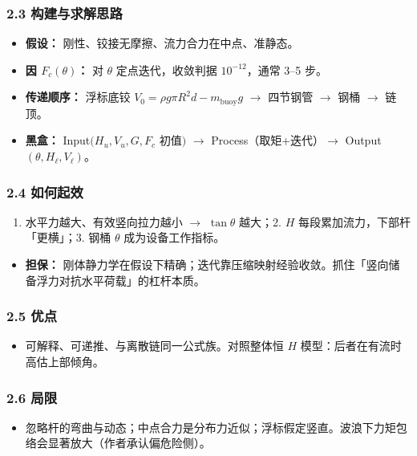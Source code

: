\documentclass[UTF8,a4paper,zihao=-4]{ctexart}
\begin{document}
\subsubsection{\texorpdfstring{2.3 构建与求解思路}{2.3 构建与求解思路}}
\begin{itemize}[leftmargin=1.5em]
\item \textbf{假设：} 刚性、铰接无摩擦、流力合力在中点、准静态。
\item \textbf{因 \(F_c(\theta)\)：} 对 \(\theta\) 定点迭代，收敛判据 \(10^{-12}\)，通常 3--5 步。
\item \textbf{传递顺序：} 浮标底铰 \(V_0=\rho g\pi R^2 d-m_{\mathrm{buoy}}g\) $\rightarrow$ 四节钢管 $\rightarrow$ 钢桶 $\rightarrow$ 链顶。
\item \textbf{黑盒：} Input\((H_u,V_u,G,F_c\) 初值\()\) $\rightarrow$ Process（取矩+迭代）$\rightarrow$ Output\((\theta,H_\ell,V_\ell)\)。
\end{itemize}

\subsubsection{\texorpdfstring{2.4 如何起效}{2.4 如何起效}}
\begin{enumerate}[leftmargin=1.8em]
\item 水平力越大、有效竖向拉力越小 $\rightarrow$ \(\tan\theta\) 越大；2. \(H\) 每段累加流力，下部杆「更横」；3. 钢桶 \(\theta\) 成为设备工作指标。  
\end{enumerate}
\begin{itemize}[leftmargin=1.5em]
\item \textbf{担保：} 刚体静力学在假设下精确；迭代靠压缩映射经验收敛。抓住「竖向储备浮力对抗水平荷载」的杠杆本质。
\end{itemize}

\subsubsection{\texorpdfstring{2.5 优点}{2.5 优点}}
\begin{itemize}[leftmargin=1.5em]
\item 可解释、可递推、与离散链同一公式族。对照整体恒 \(H\) 模型：后者在有流时高估上部倾角。
\end{itemize}

\subsubsection{\texorpdfstring{2.6 局限}{2.6 局限}}
\begin{itemize}[leftmargin=1.5em]
\item 忽略杆的弯曲与动态；中点合力是分布力近似；浮标假定竖直。波浪下力矩包络会显著放大（作者承认偏危险侧）。
\end{itemize}
\end{document}

